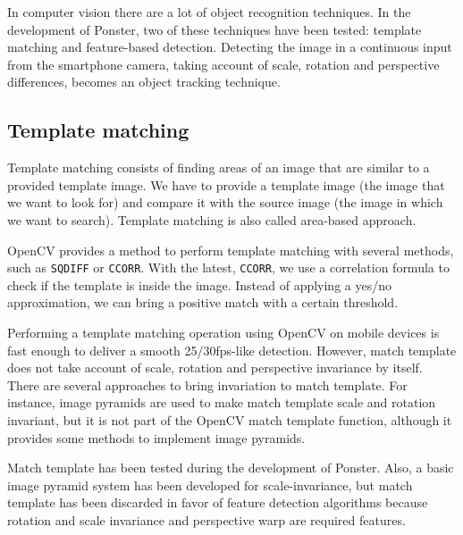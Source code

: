 In computer vision there are a lot of object recognition techniques. In the
development of Ponster, two of these techniques have been tested: template
matching and feature-based detection. Detecting the image in a continuous input from
the smartphone camera, taking account of scale, rotation and perspective
differences, becomes an object tracking technique. 

\subsection{Template matching}
Template matching consists of finding areas of an image that are similar to a
provided template image. We have to provide a template image (the image that we want
to look for) and compare it with the source image (the image in which we want to
search). Template matching is also called area-based approach.

OpenCV provides a method to perform template matching with several methods, such as
\texttt{SQDIFF} or \texttt{CCORR}. With the latest, \texttt{CCORR}, we use a
correlation formula to check if the template is inside the image. Instead of
applying a yes/no approximation, we can bring a positive match with a certain
threshold. 


Performing a template matching operation using OpenCV on mobile devices is fast
enough to deliver a smooth 25/30fps-like detection. However, match template does not
take account of scale, rotation and perspective invariance by itself. There are
several approaches to bring invariation to match template. For instance, image
pyramids are used to make match template scale and rotation
invariant, but it is not part of the OpenCV match template function, although it
provides some methods to implement image pyramids. 

Match template has been tested during the development of Ponster. Also, a basic
image pyramid system has been developed for scale-invariance, but match template has
been discarded in favor of feature detection algorithms because rotation and scale
invariance and perspective warp are required features.

